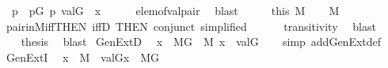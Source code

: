 \begin{isabellebody}
\ {\isasymtheta}\ p\ \ {\isachardoublequoteopen}p{\isasymin}G{\isachardoublequoteclose}\ {\isachardoublequoteopen}{\isasymlangle}{\isasymtheta}{\isacharcomma}{\kern0pt}p{\isasymrangle}{\isasymin}{\isasympi}{\isachardoublequoteclose}\ {\isachardoublequoteopen}val{\isacharparenleft}{\kern0pt}G{\isacharcomma}{\kern0pt}{\isasymtheta}{\isacharparenright}{\kern0pt}\ {\isacharequal}{\kern0pt}\ x{\isachardoublequoteclose}\isanewline
\ \ \ \ \isamarkupfalse%
\ elem{\isacharunderscore}{\kern0pt}of{\isacharunderscore}{\kern0pt}val{\isacharunderscore}{\kern0pt}pair\ \isamarkupfalse%
\ blast\isanewline
\ \ \isamarkupfalse%
\ \isamarkupfalse%
\ this\ {\isacartoucheopen}{\isasympi}{\isasymin}M{\isacartoucheclose}\isanewline
\ \ \isamarkupfalse%
\ {\isachardoublequoteopen}{\isasymtheta}{\isasymin}M{\isachardoublequoteclose}\isanewline
\ \ \ \ \isamarkupfalse%
\ pair{\isacharunderscore}{\kern0pt}in{\isacharunderscore}{\kern0pt}M{\isacharunderscore}{\kern0pt}iff{\isacharbrackleft}{\kern0pt}THEN\ iffD{}{\isacharcomma}{\kern0pt}\ THEN\ conjunct{}{\isacharcomma}{\kern0pt}\ simplified{\isacharbrackright}{\kern0pt}\isanewline
\ \ \ \ \ \ transitivity\ \isamarkupfalse%
\ blast\isanewline
\ \ \isamarkupfalse%
\isanewline
\ \ \isamarkupfalse%
\ {\isacharquery}{\kern0pt}thesis\ \isamarkupfalse%
\ blast\isanewline
{}\isamarkupfalse%
%
\endisatagproof
{\isafoldproof}%
%
\isadelimproof
\isanewline
%
\endisadelimproof
\isanewline
\isanewline
{}\isamarkupfalse%
\ GenExtD{\isacharcolon}{\kern0pt}\isanewline
\ \ {\isachardoublequoteopen}x\ {\isasymin}\ M{\isacharbrackleft}{\kern0pt}G{\isacharbrackright}{\kern0pt}\ {\isasymLongrightarrow}\ {\isasymexists}{\isasymtau}{\isasymin}M{\isachardot}{\kern0pt}\ x\ {\isacharequal}{\kern0pt}\ val{\isacharparenleft}{\kern0pt}G{\isacharcomma}{\kern0pt}{\isasymtau}{\isacharparenright}{\kern0pt}{\isachardoublequoteclose}\isanewline
%
\isadelimproof
\ \ %
\endisadelimproof
%
\isatagproof
{}\isamarkupfalse%
\ {\isacharparenleft}{\kern0pt}simp\ add{\isacharcolon}{\kern0pt}GenExt{\isacharunderscore}{\kern0pt}def{\isacharparenright}{\kern0pt}%
\endisatagproof
{\isafoldproof}%
%
\isadelimproof
\isanewline
%
\endisadelimproof
\isanewline
{}\isamarkupfalse%
\ GenExtI{\isacharcolon}{\kern0pt}\isanewline
\ \ {\isachardoublequoteopen}x\ {\isasymin}\ M\ {\isasymLongrightarrow}\ val{\isacharparenleft}{\kern0pt}G{\isacharcomma}{\kern0pt}x{\isacharparenright}{\kern0pt}\ {\isasymin}\ M{\isacharbrackleft}{\kern0pt}G{\isacharbrackright}{\kern0pt}{\isachardoublequoteclose}\isanewline

\end{isabellebody}
